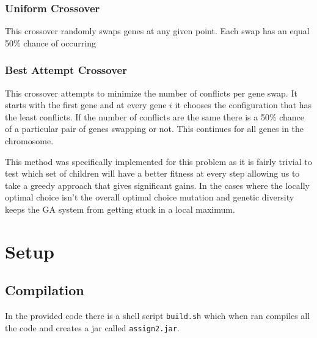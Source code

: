 \documentclass[conference]{IEEEtran}
\begin{document}
\subsubsection{Uniform Crossover} This crossover randomly swaps genes at any given point. Each swap has an equal 50\% chance of occurring
\begin{center}

\end{center}

\subsubsection{Best Attempt Crossover}
This crossover attempts to minimize the number of conflicts per gene swap. It starts with the first gene and at every gene $i$ it chooses the configuration that has the least conflicts. If the number of conflicts are the same there is a 50\% chance of a particular pair of genes swapping or not. This continues for all genes in the chromosome. 

\begin{center}

\end{center}

This method was specifically implemented for this problem as it is fairly trivial to test which set of children will have a better fitness at every step allowing us to take a greedy approach that gives significant gains. In the cases where the locally optimal choice isn't the overall optimal choice mutation and genetic diversity keeps the GA system from getting stuck in a local maximum. 

\section{Setup}
\subsection{Compilation}
In the provided code there is a shell script \texttt{build.sh} which when ran compiles all the code and creates a jar called \texttt{assign2.jar}. 
\end{document}
